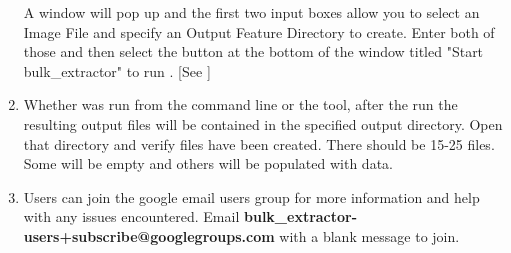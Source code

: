 \documentclass[11pt]{article} %
\begin{document}
\begin{enumerate}
\noindent
\begin{minipage}{\linewidth}
\label{fig:runBulk1}
\end{minipage}

A window will pop up and the first two input boxes allow you to select an Image File and specify an Output Feature Directory to create. Enter both of those and then select the button at the bottom of the window titled "Start bulk\_extractor" to run \bulk.
[See \textbf{} \textbf{}]

\item Whether \bulk was run from the command line or the \viewer tool, after the run the resulting output files will be contained in the specified output directory. Open that directory and verify files have been created. There should be 15-25 files. Some will be empty and others will be populated with data.

\item Users can join the google email users group for more information and help with any issues encountered. Email \textbf{bulk\_extractor-users+subscribe@googlegroups.com} with a blank message to join.
\end{enumerate}
\newpage
\end{document}
